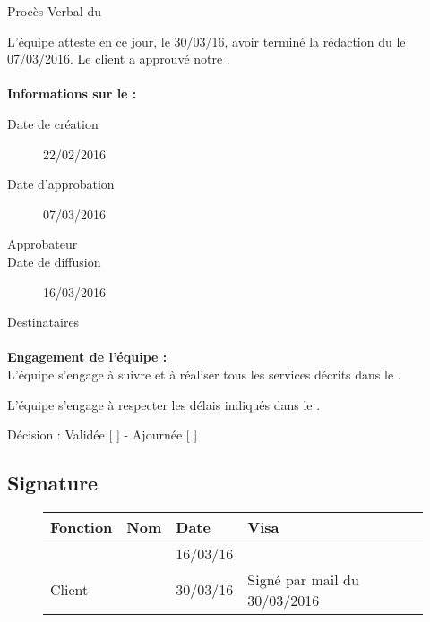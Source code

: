 \documentclass[asi, sansVersion]{picInsa}
\begin{document}
 
 \begin{center}
  \LARGE{}
    Procès Verbal du \DSE \\
 \end{center}
 
 \normalsize{}
 
L'équipe \nomEquipe{} atteste en ce jour, le 30/03/16, avoir terminé la rédaction du \DSE le 07/03/2016.
Le client a approuvé notre \DSE.


\paragraph{}
\textbf{Informations sur le \DSECourt{} :}

\begin{description}
  \item[Date de création]22/02/2016
  \item[Date d'approbation]07/03/2016
  \item[Approbateur]\nomClient
  \item[Date de diffusion]16/03/2016
  \item[Destinataires]\nomEquipe
\end{description}

\paragraph{}
\textbf{Engagement de l'équipe :}\\


L'équipe \nomEquipe{} s'engage à suivre et à réaliser tous les services décrits dans le \DSE.


L'équipe \nomEquipe{} s'engage à respecter les délais indiqués dans le \DSE.


\begin{center}
Décision : Validée [ \checkmark{} ] - Ajournée [ ]
\end{center}

\subsection*{Signature}
\begin{figure}[H]
		\centering
		\begin{tabularx}{17cm}{|p{4cm}|X|X|X|X|}
		\hline
		\rowcolor[gray]{0.85} Fonction & Nom & Date & Visa \\
		\hline
		\CP{} & \Sergi{} & 16/03/16 & \\
		\hline
		Client & \nomClient & 30/03/16 & Signé par mail du 30/03/2016 \\
		\hline
		\end{tabularx}
\end{figure}
\end{document}
